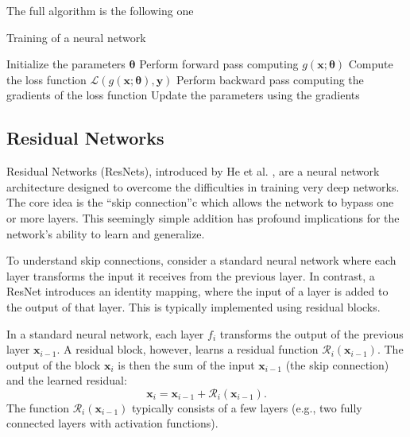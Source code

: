 The full algorithm is the following one \cite{Rumelhart_Hinton_Williams_1986}
\begin{algorithm}
    \caption{Training of a neural network}
    \begin{algorithmic}
        \State Initialize the parameters \( \bm{\theta} \)
                \State Perform forward pass computing \( g(\bm{x}; \bm{\theta}) \)
                \State Compute the loss function \( \mathcal{L}(g(\bm{x}; \bm{\theta}), \bm{y}) \)
                \State Perform backward pass computing the gradients of the loss function
                \State Update the parameters using the gradients
            \EndFor
        \EndWhile
    \end{algorithmic}
\end{algorithm}

\subsection{Residual Networks}
Residual Networks (ResNets), introduced by He et al. \cite{He_Zhang_Ren_Sun_2015}, are a neural network architecture designed to overcome the difficulties in training very deep networks. The core idea is the ``skip connection''c which allows the network to bypass one or more layers. This seemingly simple addition has profound implications for the network's ability to learn and generalize.

To understand skip connections, consider a standard neural network where each layer transforms the input it receives from the previous layer. In contrast, a ResNet introduces an identity mapping, where the input of a layer is added to the output of that layer. This is typically implemented using residual blocks.


In a standard neural network, each layer \(f_i\) transforms the output of the previous layer \( \bm{x}_{i-1} \). A residual block, however, learns a residual function \( \mathcal{R}_i(\bm{x}_{i-1}) \). The output of the block \( \bm{x}_i \) is then the sum of the input \( \bm{x}_{i-1} \) (the skip connection) and the learned residual:
\begin{equation}
    \bm{x}_i = \bm{x}_{i-1} + \mathcal{R}_i(\bm{x}_{i-1}).
\end{equation}
The function \( \mathcal{R}_i(\bm{x}_{i-1}) \) typically consists of a few layers (e.g., two fully connected layers with activation functions).

